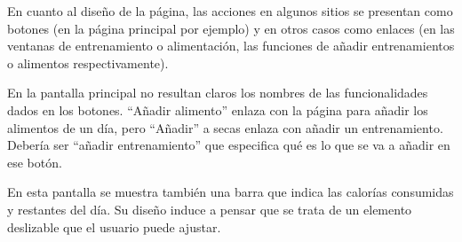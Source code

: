 \documentclass[a4paper]{article}
\begin{document}
			En cuanto al diseño de la página, las acciones en algunos sitios se presentan como botones (en la página principal por ejemplo) y en otros casos como enlaces (en las ventanas de entrenamiento o alimentación, las funciones de añadir entrenamientos o alimentos respectivamente).
			
			En la pantalla principal no resultan claros los nombres de las funcionalidades dados en los botones. ``Añadir alimento'' enlaza con la página para añadir los alimentos de un día, pero ``Añadir'' a secas enlaza con añadir un entrenamiento. Debería ser ``añadir entrenamiento'' que especifica qué es lo que se va a añadir en ese botón.
			
			En esta pantalla se muestra también una barra que indica las calorías consumidas y restantes del día. Su diseño induce a pensar que se trata de un elemento deslizable que el usuario puede ajustar.
			
\end{document}
